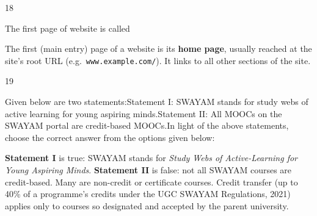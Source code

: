 \begin{question}{18}
{The first page of website is called\par}
\begin{explain}
The first (main entry) page of a website is its \textbf{home page}, usually reached at the site's root URL (e.g.\ \texttt{www.example.com/}). It links to all other sections of the site.
\end{explain}
\end{question}

\begin{question}{19}
{Given below are two statements:\newline Statement I: SWAYAM stands for study webs of active learning for young aspiring minds.\newline Statement II: All MOOCs on the SWAYAM portal are credit-based MOOCs.\newline In light of the above statements, choose the correct answer from the options given below:\par}
\begin{explain}
\textbf{Statement I} is true: SWAYAM stands for \emph{Study Webs of Active-Learning for Young Aspiring Minds}.
\textbf{Statement II} is false: not all SWAYAM courses are credit-based. Many are non-credit or certificate courses. Credit transfer (up to 40\% of a programme's credits under the UGC SWAYAM Regulations, 2021) applies only to courses so designated and accepted by the parent university.
\end{explain}
\end{question}

